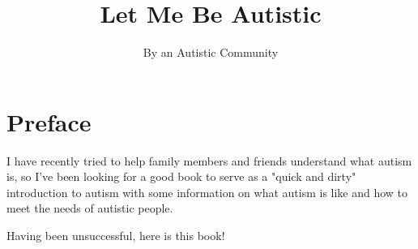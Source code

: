 \documentclass[14pt,letterpaper,oneside]{book} %
\title{Let Me Be Autistic}
\author{By an Autistic Community}
\begin{document}
	
	\frontmatter
	
	
	
	\chapter*{Preface}
	I have recently tried to help family members and friends understand what autism is, so I've been looking for a good book to serve as a "quick and dirty" introduction to autism with some information on what autism is like and how to meet the needs of autistic people.
	
	Having been unsuccessful, here is this book!
	
	\newpage
	\tableofcontents
	
	\mainmatter
	
%	
%	
%	
%	
%	
%	
%	
%	
%	
%	
%	
	
	
\end{document}
